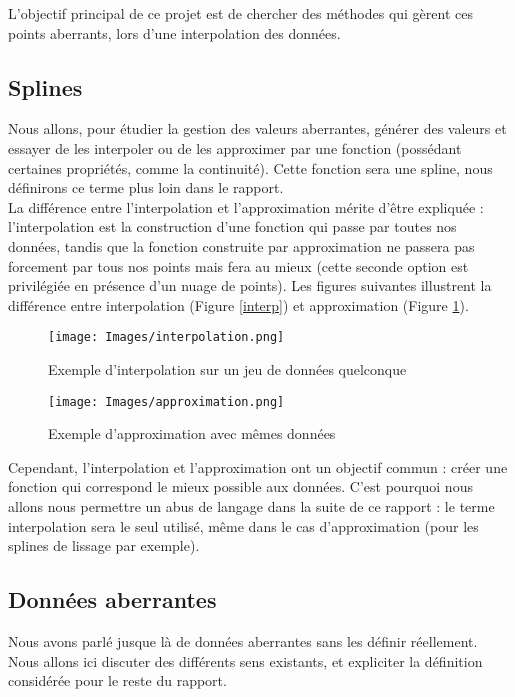 \documentclass[a4paper,12pt]{article} %
\begin{document}
        L'objectif principal de ce projet est de chercher des méthodes qui gèrent ces points aberrants, lors d'une interpolation des données.
		\subsection{Splines}
		    Nous allons, pour étudier la gestion des valeurs aberrantes, générer des valeurs et essayer de les interpoler ou de les approximer par une fonction (possédant certaines propriétés, comme la continuité). Cette fonction sera une spline, nous définirons ce terme plus loin dans le rapport.\\
		    
			 La différence entre l'interpolation et l'approximation mérite d'être expliquée : l'interpolation est la construction d'une fonction qui passe par toutes nos données, tandis que la fonction construite par approximation ne passera pas forcement par tous nos points mais fera au mieux (cette seconde option est privilégiée en présence d'un nuage de points). Les figures suivantes illustrent la différence entre interpolation (Figure \ref{interp}) et approximation (Figure \ref{approx}).
			 
			  \begin{figure}[h]
                    \centering
                    \texttt{[image: Images/interpolation.png]}
                    \caption{\label{interp}Exemple d'interpolation sur un jeu de données quelconque}
                    \texttt{[image: Images/approximation.png]}
                    \caption{\label{approx}Exemple d'approximation avec mêmes données}
                \end{figure}
			 
			 Cependant, l'interpolation et l'approximation ont un objectif commun : créer une fonction qui correspond le mieux possible aux données. C'est pourquoi nous allons nous permettre un abus de langage dans la suite de ce rapport : le terme interpolation sera le seul utilisé, même dans le cas d'approximation (pour les splines de lissage par exemple).
			 
		\subsection{Données aberrantes}
		    Nous avons parlé jusque là de données aberrantes sans les définir réellement. Nous allons ici discuter des différents sens existants, et expliciter la définition considérée pour le reste du rapport.\\
		    
\end{document}
